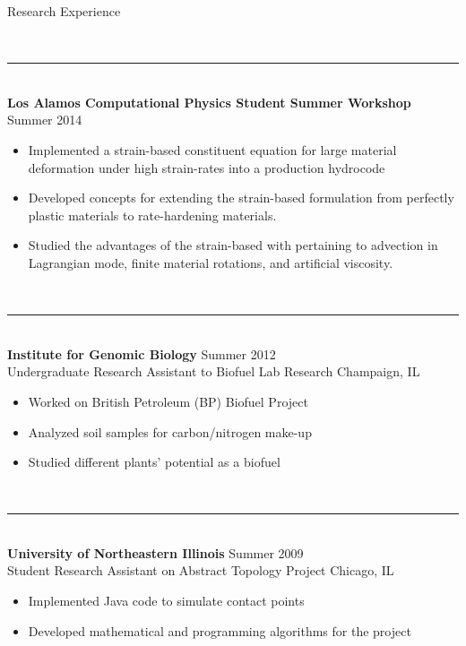 \documentclass{resume} %
\begin{document}
\begin{rSection}{Research Experience}
\begin{itemize}
	\end{itemize}
	\\
	{\centering\noindent\rule{5cm}{0.4pt}}
	\\
	{\bf Los Alamos Computational Physics Student Summer Workshop} \hfill {Summer 2014}
	\begin{itemize}
	\item Implemented a strain-based constituent equation for large material deformation under high strain-rates into a production hydrocode
	\item Developed concepts for extending the strain-based formulation from perfectly plastic materials to rate-hardening materials.
	\item Studied the advantages of the strain-based with pertaining to advection in Lagrangian mode, finite material rotations, and artificial viscosity.
	\end{itemize}
	\\
	{\centering\noindent\rule{5cm}{0.4pt}}
	\\
	{\bf Institute for Genomic Biology} \hfill {Summer 2012}\\
	Undergraduate Research Assistant to Biofuel Lab Research \hfill {Champaign, IL}
	\begin{itemize}
	\item Worked on British Petroleum (BP) Biofuel Project
	\item Analyzed soil samples for carbon/nitrogen make-up
	\item Studied different plants' potential as a biofuel
	\end{itemize}
	\\
	{\centering\noindent\rule{5cm}{0.4pt}}
	\\
	{\bf University of Northeastern Illinois} \hfill {Summer 2009}\\
	Student Research Assistant on Abstract Topology Project \hfill {Chicago, IL}
	\begin{itemize}
	\item Implemented Java code to simulate contact points
	\item Developed mathematical and programming algorithms for the project
	\end{itemize} \\
	
\end{rSection}



\end{document}

